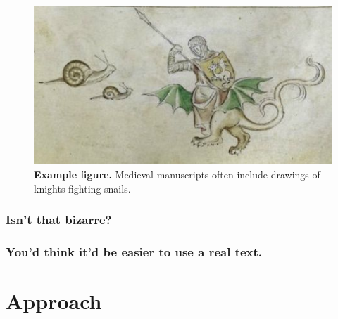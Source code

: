 \documentclass{nihgrant}
\begin{document}
\begin{figure}
  \vspace{-0.25cm}
  \includegraphics[scale=0.48]{Knight-fighting-snail-470.jpg}
  \caption{
  \textbf{Example figure.}
  Medieval manuscripts often include drawings of knights fighting snails.
}
\label{fig:example}
\vspace{-0.25cm}
\end{figure}

\subsubsection*{Isn't that bizarre?}
\lipsum[3-3]

\subsubsection*{You'd think it'd be easier to use a real text.}
\lipsum[4-4]

\section*{Approach}
\lipsum[5-5]

\pagebreak
 
\end{document}
